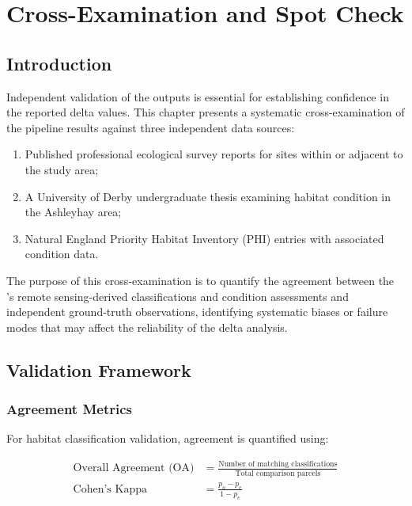 \chapter{Cross-Examination and Spot Check}
\label{ch:spotcheck}

\section{Introduction}

Independent validation of the \BDE{} outputs is essential for establishing confidence in the reported delta values. This chapter presents a systematic cross-examination of the pipeline results against three independent data sources:

\begin{enumerate}
  \item Published professional ecological survey reports for sites within or adjacent to the study area;
  \item A University of Derby undergraduate thesis examining habitat condition in the Ashleyhay area;
  \item Natural England Priority Habitat Inventory (PHI) entries with associated condition data.
\end{enumerate}

The purpose of this cross-examination is to quantify the agreement between the \BDE{}'s remote sensing-derived classifications and condition assessments and independent ground-truth observations, identifying systematic biases or failure modes that may affect the reliability of the delta analysis.


\section{Validation Framework}

\subsection{Agreement Metrics}

For habitat classification validation, agreement is quantified using:

\begin{align}
\text{Overall Agreement (OA)} &= \frac{\text{Number of matching classifications}}{\text{Total comparison parcels}} \label{eq:oa-validation} \\[6pt]
\text{Cohen's Kappa} &= \frac{p_o - p_e}{1 - p_e} \label{eq:kappa}
\end{align}

